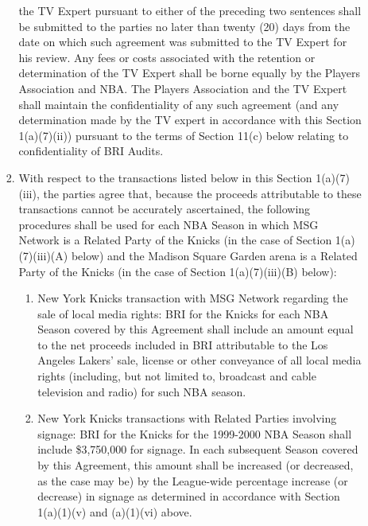 \documentclass[
]{book}
\providecommand{\tightlist}{%
  \setlength{\itemsep}{0pt}\setlength{\parskip}{0pt}}
\begin{document}
\begin{enumerate}
\begin{enumerate}
\begin{enumerate}
the TV Expert pursuant to either of the preceding two sentences shall be submitted to the parties no later than twenty (20) days from the date on which such agreement was submitted to the TV Expert for his review. Any fees or costs associated with the retention or determination of the TV Expert shall be borne equally by the Players Association and NBA. The Players Association and the TV Expert shall maintain the confidentiality of any such agreement (and any determination made by the TV expert in accordance with this Section 1(a)(7)(ii)) pursuant to the terms of Section 11(c) below relating to confidentiality of BRI Audits.
    \item
      With respect to the transactions listed below in this Section 1(a)(7)(iii), the parties agree that, because the proceeds attributable to these transactions cannot be accurately ascertained, the following procedures shall be used for each NBA Season in which MSG Network is a Related Party of the Knicks (in the case of Section 1(a)(7)(iii)(A) below) and the Madison Square Garden arena is a Related Party of the Knicks (in the case of Section 1(a)(7)(iii)(B) below):

      \begin{enumerate}
      \def\labelenumiv{(\Alph{enumiv})}
      \tightlist
      \item
        New York Knicks transaction with MSG Network regarding the sale of local media rights: BRI for the Knicks for each NBA Season covered by this Agreement shall include an amount equal to the net proceeds included in BRI attributable to the Los Angeles Lakers' sale, license or other conveyance of all local media rights (including, but not limited to, broadcast and cable television and radio) for such NBA season.
      \item
        New York Knicks transactions with Related Parties involving signage: BRI for the Knicks for the 1999-2000 NBA Season shall include \$3,750,000 for signage. In each subsequent Season covered by this Agreement, this amount shall be increased (or decreased, as the case may be) by the League-wide percentage increase (or decrease) in signage as determined in accordance with Section 1(a)(1)(v) and (a)(1)(vi) above.
      \end{enumerate}


\end{enumerate}
\end{enumerate}
\end{enumerate}
\end{document}
